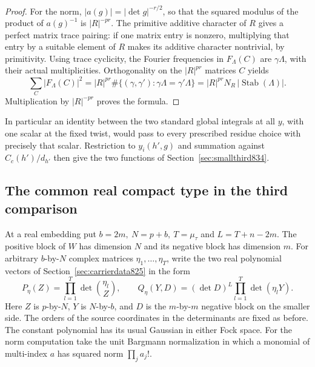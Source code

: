 \documentclass[a4paper,11pt]{article}
\theoremstyle{definition}
\theoremstyle{remark}
\numberwithin{equation}{section}
\begin{document}
\begin{proof}
For the norm, \(|a(g)|=|\det g|^{-r/2}\), so that the
squared modulus of the product of \(a(g)^{-1}\) is
\(|R|^{-pr}\). The primitive additive character of \(R\)
gives a perfect matrix trace pairing: if one matrix entry
is nonzero, multiplying that entry by a suitable element of
\(R\) makes its additive character nontrivial, by primitivity.
Using trace cyclicity, the Fourier frequencies in
\(F_\Lambda(C)\) are \(\gamma\Lambda\), with their actual
multiplicities. Orthogonality on the \(|R|^{pr}\) matrices
\(C\) yields
\[
 \sum_C |F_\Lambda(C)|^2
  =|R|^{pr}\#\{(\gamma,\gamma'):\gamma\Lambda=\gamma'\Lambda\}
  =|R|^{pr}N_R\,|\operatorname{Stab}(\Lambda)|.
\]
Multiplication by \(|R|^{-pr}\) proves the formula.
\end{proof}

In particular an identity between the two standard global
integrals at all \(y\), with one scalar at the fixed twist,
would pass to every prescribed residue choice with precisely
that scalar. Restriction to \(y_i(h',g)\) and summation against
\(C_c(h')/d_{h'}\) then give the two functions of
Section~\ref{sec:smallthird834}.
\clearpage

\subsection{The common real compact type in the third comparison}
\label{sec:thirdreal838}
At a real embedding put \(b=2m,\ N=p+b,\ T=\mu_\tau\) and
\(L=T+n-2m\). The positive block of \(W\) has dimension
\(N\) and its negative block has dimension \(m\).
For arbitrary \(b\)-by-\(N\) complex matrices
\(\eta_1,\ldots,\eta_T\), write the two real polynomial
vectors of Section~\ref{sec:carrierdata825} in the form
\[
 P_\eta(Z)=\prod_{l=1}^T\det\binom{\eta_l}{Z},\qquad
 Q_\eta(Y,D)=(\det D)^L\prod_{l=1}^T\det(\eta_lY).
\]
Here \(Z\) is \(p\)-by-\(N\), \(Y\) is \(N\)-by-\(b\), and
\(D\) is the \(m\)-by-\(m\) negative block on the smaller
side. The orders of the source coordinates in the determinants
are fixed as before. The constant polynomial has its usual
Gaussian in either Fock space. For the norm computation take
the unit Bargmann normalization in which a monomial of
multi-index \(a\) has squared norm \(\prod_j a_j!\).
\end{document}
